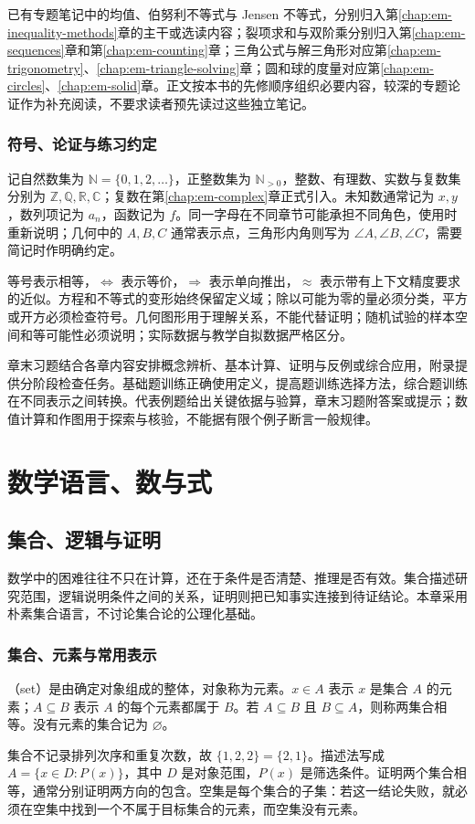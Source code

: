 \documentclass[UTF8]{ctexbook}
\begin{document}
已有专题笔记中的均值、伯努利不等式与 Jensen 不等式，分别归入第\ref{chap:em-inequality-methods}章的主干或选读内容；裂项求和与双阶乘分别归入第\ref{chap:em-sequences}章和第\ref{chap:em-counting}章；三角公式与解三角形对应第\ref{chap:em-trigonometry}、\ref{chap:em-triangle-solving}章；圆和球的度量对应第\ref{chap:em-circles}、\ref{chap:em-solid}章。正文按本书的先修顺序组织必要内容，较深的专题论证作为补充阅读，不要求读者预先读过这些独立笔记。

\section*{符号、论证与练习约定}
记自然数集为 $\mathbb N=\{0,1,2,\ldots\}$，正整数集为 $\mathbb N_{>0}$，整数、有理数、实数与复数集分别为 $\mathbb Z,\mathbb Q,\mathbb R,\mathbb C$；复数在第\ref{chap:em-complex}章正式引入。未知数通常记为 $x,y$，数列项记为 $a_n$，函数记为 $f$。同一字母在不同章节可能承担不同角色，使用时重新说明；几何中的 $A,B,C$ 通常表示点，三角形内角则写为 $\angle A,\angle B,\angle C$，需要简记时作明确约定。

等号表示相等，$\Longleftrightarrow$ 表示等价，$\Longrightarrow$ 表示单向推出，$\approx$ 表示带有上下文精度要求的近似。方程和不等式的变形始终保留定义域；除以可能为零的量必须分类，平方或开方必须检查符号。几何图形用于理解关系，不能代替证明；随机试验的样本空间和等可能性必须说明；实际数据与教学自拟数据严格区分。

章末习题结合各章内容安排概念辨析、基本计算、证明与反例或综合应用，附录提供分阶段检查任务。基础题训练正确使用定义，提高题训练选择方法，综合题训练在不同表示之间转换。代表例题给出关键依据与验算，章末习题附答案或提示；数值计算和作图用于探索与核验，不能据有限个例子断言一般规律。

\part{数学语言、数与式}

\chapter{集合、逻辑与证明}
\label{chap:em-language}
数学中的困难往往不只在计算，还在于条件是否清楚、推理是否有效。集合描述研究范围，逻辑说明条件之间的关系，证明则把已知事实连接到待证结论。本章采用朴素集合语言，不讨论集合论的公理化基础。

\section{集合、元素与常用表示}
\begin{definition}
（set）是由确定对象组成的整体，对象称为元素。$x\in A$ 表示 $x$ 是集合 $A$ 的元素；$A\subseteq B$ 表示 $A$ 的每个元素都属于 $B$。若 $A\subseteq B$ 且 $B\subseteq A$，则称两集合相等。没有元素的集合记为 $\varnothing$。
\end{definition}
集合不记录排列次序和重复次数，故 $\{1,2,2\}=\{2,1\}$。描述法写成 $A=\{x\in D:P(x)\}$，其中 $D$ 是对象范围，$P(x)$ 是筛选条件。证明两个集合相等，通常分别证明两方向的包含。空集是每个集合的子集：若这一结论失败，就必须在空集中找到一个不属于目标集合的元素，而空集没有元素。
\end{document}
